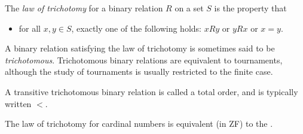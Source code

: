 \documentclass[12pt]{article}
\begin{document}

The \emph{law of trichotomy} for a binary relation $R$ on a set $S$ is the property that
\begin{itemize}
\item for all $x,y\in S$, exactly one of the following holds: $xRy$ or $yRx$ or $x=y$.
\end{itemize}
A binary relation satisfying the law of trichotomy is sometimes said to be \emph{trichotomous}.
Trichotomous binary relations are equivalent to tournaments,
although the study of tournaments is usually restricted to the finite case.

A transitive trichotomous binary relation is called a total order, and is typically written $<$.

The law of trichotomy for cardinal numbers is equivalent (in ZF) to the .
\end{document}
